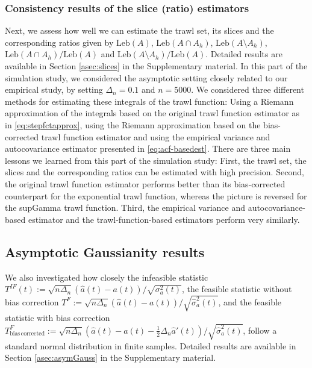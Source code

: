\documentclass{article}
\theoremstyle{plain}
\theoremstyle{definition}
\theoremstyle{remark}
\newcommand{\Leb}{\ensuremath{\mathrm{Leb}}}
\begin{document}
\subsubsection{Consistency results of the slice (ratio) estimators}
Next, we assess
how well we can estimate the trawl set, its slices and the corresponding ratios given by
$\mathrm{\Leb}(A)$, $\mathrm{\Leb}(A\cap A_h)$, 
$\mathrm{\Leb}(A \setminus A_h)$, $\mathrm{\Leb}(A\cap A_h)/\mathrm{\Leb}(A)$ and  $\mathrm{\Leb}(A \setminus A_h)/\mathrm{\Leb}(A)$.
Detailed results are available in
Section \ref{asec:slices} in the Supplementary material. 
In this part of the simulation study, we considered the asymptotic setting closely related to our empirical study, by setting 
$\Delta_n=0.1$ and $n=5000$.
We considered three different methods for estimating these integrals of the trawl function: Using a Riemann approximation of the integrals based on the original trawl function estimator as in \eqref{eq:stepfctapprox}, using the Riemann approximation based on the bias-corrected trawl function estimator and using the empirical variance and autocovariance estimator presented in \eqref{eq:acf-basedest}. 
There are three main lessons we learned from this part of the simulation study: First, the trawl set, the slices and the corresponding ratios can be estimated with high precision. Second,  the original trawl function estimator performs better than its bias-corrected counterpart for the exponential trawl function, whereas the picture is reversed for the supGamma trawl function. 
Third, the empirical variance and autocovariance-based estimator and the trawl-function-based estimators perform very similarly. 




\subsection{Asymptotic Gaussianity results}
We also investigated how closely
the infeasible statistic
$T^{IF}(t):=\sqrt{n\Delta_{n}}\left(\hat{a}(t)-a(t)\right)/\sqrt{\sigma_a^2(t)}$,
the feasible statistic without bias correction
$T^{F}:=\sqrt{n\Delta_{n}}\left(\hat{a}(t)-a(t)\right)/\sqrt{\hat \sigma_a^2(t)}$, 
and the feasible statistic with bias correction
$T^{F}_{\mathrm{bias \, corrected}}:=\sqrt{n\Delta_{n}}\left(\hat{a}(t)-a(t)-\frac{1}{2}\Delta_n \hat a'(t)\right)/\sqrt{\hat \sigma_a^2(t)}$, 
follow a standard normal distribution in finite samples.
Detailed results are available in Section \ref  {asec:asymGauss} in the Supplementary material.
\end{document}
